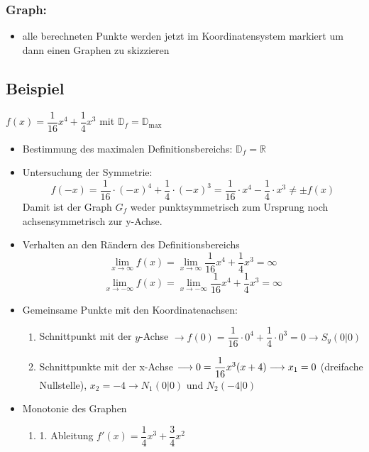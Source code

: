  \subsubsection{Graph:}
 \begin{itemize}
     \item alle berechneten Punkte werden jetzt im Koordinatensystem markiert um dann einen Graphen zu skizzieren
      \end{itemize}
   \subsection{Beispiel} 
   $f(x)= \dfrac{1}{16} x^4 +\dfrac{1}{4} x^3$ mit $\mathds{D}_f =\mathds{D}_{\max}$ 
     \begin{itemize}
         \item Bestimmung des maximalen Definitionsbereichs: $\mathds{D}_f = \mathds{R}$ 
         \item Untersuchung der Symmetrie:
    $$f(-x) = \frac{1}{16} \cdot (-x)^4 + \frac{1}{4} \cdot (-x)^3 = \frac{1}{16} \cdot x^4 - \frac{1}{4} \cdot x^3 \neq \pm f(x)$$ Damit ist der Graph $G_f$ weder punktsymmetrisch zum Ursprung noch achsensymmetrisch zur y-Achse.
    \item Verhalten an den Rändern des Definitionsbereichs
    $$\lim_{x\rightarrow \infty} f(x) = \lim_{x\rightarrow \infty} \dfrac{1}{16}x^4 +\dfrac{1}{4}x^3 = \infty$$
        $$\lim_{x\rightarrow -\infty} f(x) = \lim_{x\rightarrow -\infty} \dfrac{1}{16}x^4 +\dfrac{1}{4}x^3 = \infty$$
    \item Gemeinsame Punkte mit den Koordinatenachsen:\\
    \begin{enumerate}
    \item Schnittpunkt mit der $y$-Achse $\longrightarrow f(0) = \dfrac{1}{16}\cdot 0^4 +\dfrac{1}{4}\cdot 0^3 = 0 \longrightarrow S_y(0|0)$ \\
    \item Schnittpunkte mit der x-Achse $\longrightarrow 0 = \dfrac{1}{16} x^3 (x+4) \\\longrightarrow x_1 = 0$ (dreifache Nullstelle), $x_2 = -4 \longrightarrow N_1(0|0)$ und $N_2(-4|0)$
    \end{enumerate}
    \item Monotonie des Graphen\\
    \begin{enumerate}
    \item 1. Ableitung $f'(x)= \dfrac{1}{4} x^3 +\dfrac{3}{4} x^2$\\

\end{enumerate}
\end{itemize}
